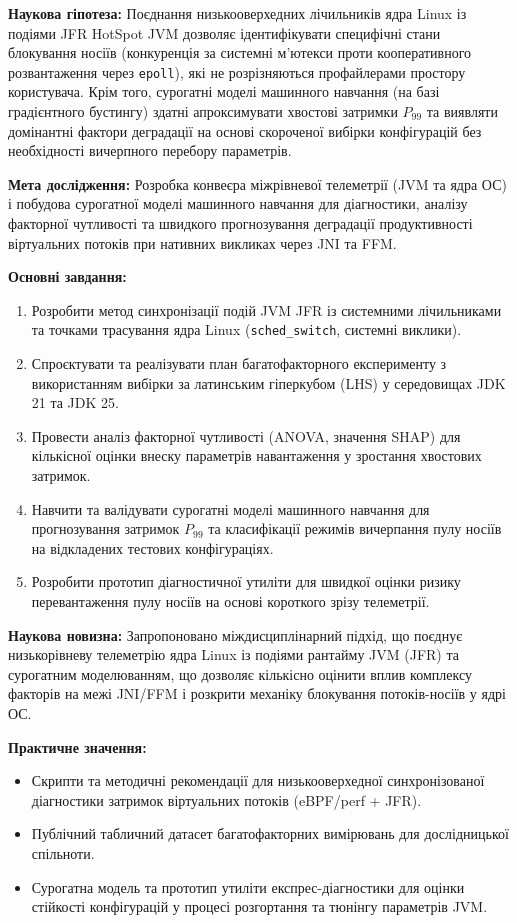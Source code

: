 \textbf{Наукова гіпотеза:} Поєднання низькооверхедних лічильників ядра Linux із подіями JFR HotSpot JVM дозволяє ідентифікувати специфічні стани блокування носіїв (конкуренція за системні м'ютекси проти кооперативного розвантаження через \texttt{epoll}), які не розрізняються профайлерами простору користувача. Крім того, сурогатні моделі машинного навчання (на базі градієнтного бустингу) здатні апроксимувати хвостові затримки $P_{99}$ та виявляти домінантні фактори деградації на основі скороченої вибірки конфігурацій без необхідності вичерпного перебору параметрів.

\textbf{Мета дослідження:} Розробка конвеєра міжрівневої телеметрії (JVM та ядра ОС) і побудова сурогатної моделі машинного навчання для діагностики, аналізу факторної чутливості та швидкого прогнозування деградації продуктивності віртуальних потоків при нативних викликах через JNI та FFM.

\textbf{Основні завдання:}
\begin{enumerate}[wide]
    \item Розробити метод синхронізації подій JVM JFR із системними лічильниками та точками трасування ядра Linux (\texttt{sched\_switch}, системні виклики).
    \item Спроєктувати та реалізувати план багатофакторного експерименту з використанням вибірки за латинським гіперкубом (LHS) у середовищах JDK 21 та JDK 25.
    \item Провести аналіз факторної чутливості (ANOVA, значення SHAP) для кількісної оцінки внеску параметрів навантаження у зростання хвостових затримок.
    \item Навчити та валідувати сурогатні моделі машинного навчання для прогнозування затримок $P_{99}$ та класифікації режимів вичерпання пулу носіїв на відкладених тестових конфігураціях.
    \item Розробити прототип діагностичної утиліти для швидкої оцінки ризику перевантаження пулу носіїв на основі короткого зрізу телеметрії.
\end{enumerate}

\textbf{Наукова новизна:} Запропоновано міждисциплінарний підхід, що поєднує низькорівневу телеметрію ядра Linux із подіями рантайму JVM (JFR) та сурогатним моделюванням, що дозволяє кількісно оцінити вплив комплексу факторів на межі JNI/FFM і розкрити механіку блокування потоків-носіїв у ядрі ОС.

\textbf{Практичне значення:}
\begin{itemize}[wide]
    \item Скрипти та методичні рекомендації для низькооверхедної синхронізованої діагностики затримок віртуальних потоків (eBPF/perf + JFR).
    \item Публічний табличний датасет багатофакторних вимірювань для дослідницької спільноти.
    \item Сурогатна модель та прототип утиліти експрес-діагностики для оцінки стійкості конфігурацій у процесі розгортання та тюнінгу параметрів JVM.
\end{itemize}

